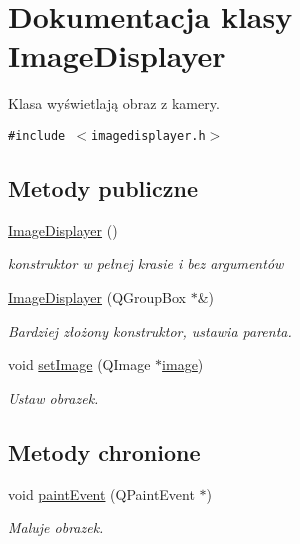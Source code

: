 \hypertarget{class_image_displayer}{
\section{Dokumentacja klasy ImageDisplayer}
\label{class_image_displayer}
}
Klasa wyświetlają obraz z kamery.  


{\tt \#include $<$imagedisplayer.h$>$}

\subsection*{Metody publiczne}
\begin{CompactItemize}
\item 
\hypertarget{class_image_displayer_b9c0301e7ed29ff2debf5e7f11c95aff}{
\hyperlink{class_image_displayer_b9c0301e7ed29ff2debf5e7f11c95aff}{ImageDisplayer} ()}
\label{class_image_displayer_b9c0301e7ed29ff2debf5e7f11c95aff}

\begin{CompactList}\small\item\em konstruktor w pełnej krasie i bez argumentów \item\end{CompactList}\item 
\hypertarget{class_image_displayer_de6ee3928461e16ae867a744b647121e}{
\hyperlink{class_image_displayer_de6ee3928461e16ae867a744b647121e}{ImageDisplayer} (QGroupBox $\ast$\&)}
\label{class_image_displayer_de6ee3928461e16ae867a744b647121e}

\begin{CompactList}\small\item\em Bardziej złożony konstruktor, ustawia parenta. \item\end{CompactList}\item 
void \hyperlink{class_image_displayer_a801ce426124fdd201a56e44e8b24610}{setImage} (QImage $\ast$\hyperlink{class_image_displayer_425fc06c5474754684575cd80e378bd1}{image})
\begin{CompactList}\small\item\em Ustaw obrazek. \item\end{CompactList}\end{CompactItemize}
\subsection*{Metody chronione}
\begin{CompactItemize}
\item 
\hypertarget{class_image_displayer_b892b4b10728fa072aedfa5a315cd319}{
void \hyperlink{class_image_displayer_b892b4b10728fa072aedfa5a315cd319}{paintEvent} (QPaintEvent $\ast$)}
\label{class_image_displayer_b892b4b10728fa072aedfa5a315cd319}

\begin{CompactList}\small\item\em Maluje obrazek. \item\end{CompactList}\end{CompactItemize}
